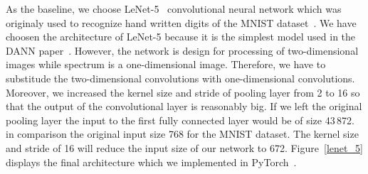 As the baseline, we choose LeNet-5~\cite{lecun1998} convolutional neural network
which was originaly used to recognize hand written digits
of the MNIST dataset~\cite{lecun1998}.
We have choosen the architecture of LeNet-5
because it is the simplest model used in the DANN paper~\cite{ganin2016}.
However, the network is design for processing of two-dimensional images
while spectrum is a one-dimensional image.
Therefore, we have to substitude the two-dimensional convolutions with one-dimensional convolutions.
Moreover, we increased the kernel size and stride of pooling layer from 2 to 16
so that the output of the convolutional layer is reasonably big.
If we left the original pooling layer
the input to the first fully connected layer would be of size 43\,872.
in comparison the original input size 768 for the MNIST dataset.
The kernel size and stride of 16 will reduce the input size of our network to 672.
Figure~\ref{lenet_5} displays the final architecture
which we implemented in PyTorch~\cite{paszke2019}.

